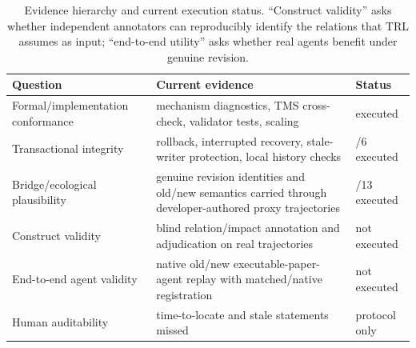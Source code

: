 \documentclass[journal]{IEEEtran}
\begin{document}
\begin{table}[t]
\centering
\caption{Evidence hierarchy and current execution status. ``Construct validity'' asks whether independent annotators can reproducibly identify the relations that TRL assumes as input; ``end-to-end utility'' asks whether real agents benefit under genuine revision.}
\label{tab:hierarchy}
\scriptsize
\begin{tabularx}{\columnwidth}{>{\raggedright\arraybackslash}p{2.15cm}>{\raggedright\arraybackslash}X>{\raggedright\arraybackslash}p{1.25cm}}
\toprule
Question & Current evidence & Status \\
\midrule
Formal/implementation conformance & mechanism diagnostics, TMS cross-check, validator tests, scaling & executed \\
Transactional integrity & rollback, interrupted recovery, stale-writer protection, local history checks & 6/6 executed \\
Bridge/ecological plausibility & 13 genuine revision identities and old/new semantics carried through developer-authored proxy trajectories & 13/13 executed \\
Construct validity & blind relation/impact annotation and adjudication on real trajectories & not executed \\
End-to-end agent validity & native old/new executable-paper-agent replay with matched/native registration & not executed \\
Human auditability & time-to-locate and stale statements missed & protocol only \\
\bottomrule
\end{tabularx}
\end{table}
\end{document}
